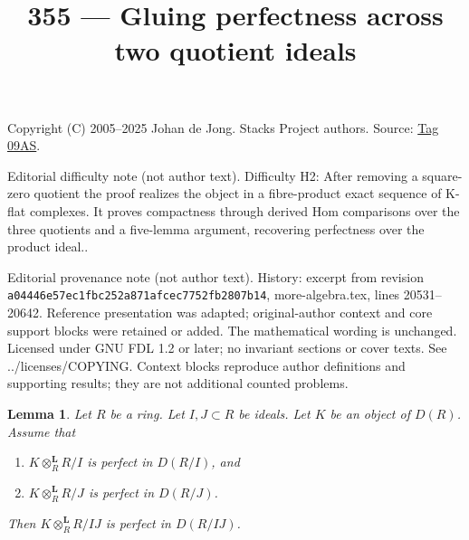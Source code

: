 \documentclass{amsart}
\theoremstyle{plain}
\newtheorem{lemma}[subsection]{Lemma}
\theoremstyle{definition}
\theoremstyle{remark}
\numberwithin{equation}{subsection}
\begin{document}
\title[Stacks Project, Tag 09AS]{355 --- Gluing perfectness across two quotient ideals}
\maketitle
\noindent Copyright (C) 2005--2025 Johan de Jong. Stacks Project authors. Source: \href{https://stacks.math.columbia.edu/tag/09AS}{Tag 09AS}.

\noindent Editorial difficulty note (not author text). Difficulty H2: After removing a square-zero quotient the proof realizes the object in a fibre-product exact sequence of K-flat complexes. It proves compactness through derived Hom comparisons over the three quotients and a five-lemma argument, recovering perfectness over the product ideal..

\noindent Editorial provenance note (not author text). History: excerpt from revision \texttt{a0444\allowbreak 6e57e\allowbreak c1fbc\allowbreak 252a8\allowbreak 71afc\allowbreak ec775\allowbreak 2fb28\allowbreak 07b14}, more-algebra.tex, lines 20531--20642. Reference presentation was adapted; original-author context and core support blocks were retained or added. The mathematical wording is unchanged. Licensed under GNU FDL 1.2 or later; no invariant sections or cover texts. See ../licenses/COPYING. Context blocks reproduce author definitions and supporting results; they are not additional counted problems.

\begin{lemma}
\label{lemma-perfect-modulo-two-ideals}
Let $R$ be a ring. Let $I, J \subset R$ be ideals.
Let $K$ be an object of $D(R)$. Assume that
\begin{enumerate}
\item $K \otimes_R^\mathbf{L} R/I$ is perfect in $D(R/I)$, and
\item $K \otimes_R^\mathbf{L} R/J$ is perfect in $D(R/J)$.
\end{enumerate}
Then $K \otimes_R^\mathbf{L} R/IJ$ is perfect in $D(R/IJ)$.
\end{lemma}
\end{document}
